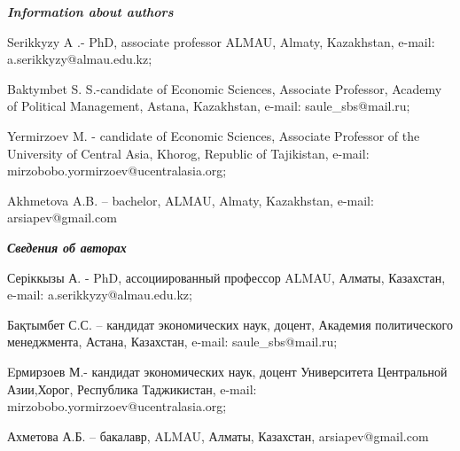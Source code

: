 \emph{{\bfseries Information about authors}}

Serikkyzy A .- PhD, associate professor ALMAU, Almaty, Kazakhstan,
e-mail: a.serikkyzy@almau.edu.kz;

Baktymbet S. S.-candidate of Economic Sciences, Associate Professor,
Academy of Political Management, Astana, Kazakhstan, e-mail:
saule\_sbs@mail.ru;

Yermirzoev M. - candidate of Economic Sciences, Associate Professor of
the University of Central Asia, Khorog, Republic of Tajikistan, e-mail:
mirzobobo.yormirzoev@ucentralasia.org;

Akhmetova A.B. -- bachelor, ALMAU, Almaty, Kazakhstan, e-mail:
arsiapev@gmail.com

\emph{{\bfseries Сведения об авторах}}

Серіккызы А. - PhD, ассоциированный профессор ALMAU, Алматы, Казахстан,
e-mail: a.serikkyzy@almau.edu.kz;

Бақтымбет С.С. -- кандидат экономических наук, доцент, Академия
политического менеджмента, Астана, Казахстан, e-mail:
saule\_sbs@mail.ru;

Eрмирзоев М.- кандидат экономических наук, доцент Университета
Центральной Азии,Хорог, Республика Таджикистан, e-mail:
mirzobobo.yormirzoev@ucentralasia.org;

Ахметова А.Б. -- бакалавр, ALMAU, Алматы, Казахстан, arsiapev@gmail.com


